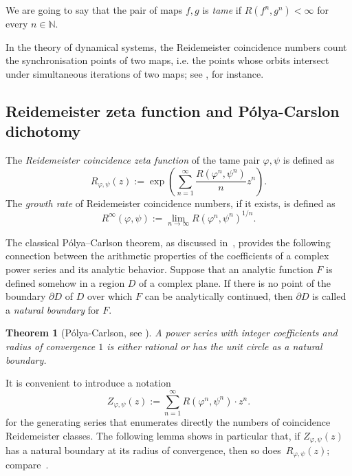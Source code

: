 \documentclass[oneside]{amsart}
\def\N{\mathbb{N}}
\newtheorem{thm}{Theorem}
\begin{document}
 We are going to say that the pair of maps $f,g$ is \emph{tame} if
 $R(f^n, g^n) < \infty$ for every $n \in \N$.

In the theory of dynamical systems, the Reidemeister coincidence
numbers count the synchronisation points of two
maps, i.e. the points whose orbits intersect under simultaneous
iterations of two maps; see \cite{Miles13}, for instance.









\subsection{Reidemeister zeta function and P\'olya-Carslon dichotomy}

The \emph{Reidemeister coincidence zeta function} of the tame pair $\varphi, \psi$ is defined as
\begin{equation*}
  R_{\varphi,\psi}(z) := \exp \left( \sum_{n=1}^\infty \frac{R(\varphi^n, \psi^n)}{n} z^n \right).
\end{equation*}
The \emph{growth rate} of Reidemeister coincidence numbers, if it exists, is defined as
\begin{equation*}
  R^\infty(\varphi, \psi) := \lim_{n \to \infty} R(\varphi^n, \psi^n)^{1/n}.
\end{equation*}


The classical P\'olya--Carlson theorem, as discussed in~\cite[\S 6.5]{Segal},
provides the following connection between the arithmetic properties of
the coefficients of a complex power series and its analytic behavior.
Suppose that an analytic function $F$ is defined somehow in a region $D$ of a complex plane.
If there is no point of the boundary $\partial D$ of $D$ over which $F$ can be analytically continued,
then $\partial D$ is called a \emph{natural boundary} for $F$.

\begin{thm}[P\'olya-Carlson, see ] \label{thm:polya-carlson}
  A power series with integer coefficients and radius of convergence $1$ is either rational
  or has the unit circle as a natural boundary.
\end{thm}
It is convenient to introduce a notation
\begin{equation*}
  Z_{\varphi, \psi}(z) := \sum_{n=1}^{\infty} R(\varphi^n, \psi^n)\cdot z^n.
\end{equation*}
for the generating series that enumerates directly the numbers of coincidence Reidemeister classes.
The following lemma shows in particular that, if $Z_{\varphi,\psi}(z)$ has a natural
boundary at its radius of convergence, then so
does~$R_{\varphi,\psi}(z)$; compare~\cite{BMW}.
\end{document}

